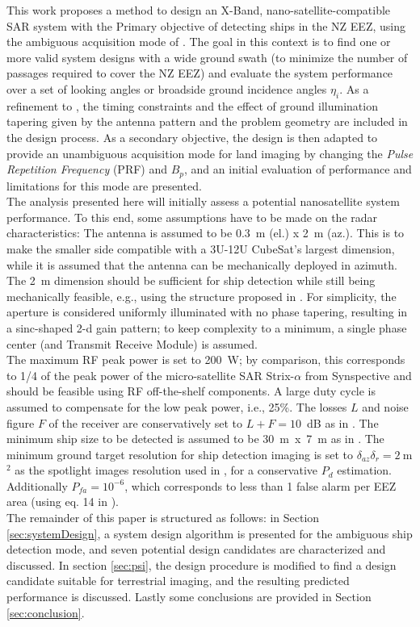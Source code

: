 \documentclass[conference,a4paper]{IEEEtran}
\begin{document}
    This work proposes a method to design an X-Band, nano-satellite-compatible SAR system with the Primary objective of detecting ships in the NZ EEZ, using the ambiguous acquisition mode of \cite{DLRjournal}.
    The goal in this context is to find one or more valid system designs with a wide ground swath (to minimize the number of passages required to cover the NZ EEZ) and evaluate the system performance over a set of looking angles or broadside ground incidence angles $\eta_i$.
    As a refinement to \cite{DLRjournal}, the timing constraints and the effect of ground illumination tapering given by the antenna pattern and the problem geometry are included in the design process.
    As a secondary objective, the design is then adapted to provide an unambiguous acquisition mode for land imaging by changing the \emph{Pulse Repetition Frequency} (PRF) and $B_p$, and an initial evaluation of performance and limitations for this mode are presented.\\
    The analysis presented here will initially assess a potential nanosatellite system performance.
    To this end, some assumptions have to be made on the radar characteristics: The antenna is assumed to be 0.3~m (el.) x 2~m (az.).
    This is to make the smaller side compatible with a 3U-12U CubeSat's largest dimension, while it is assumed that the antenna can be mechanically deployed in azimuth.
    The 2~m dimension should be sufficient for ship detection \cite{DLRjournal} while still being mechanically feasible, e.g., using the structure proposed in \cite{Annalisa}.
    For simplicity, the aperture is considered uniformly illuminated with no phase tapering, resulting in a sinc-shaped 2-d gain pattern;
    to keep complexity to a minimum, a single phase center (and Transmit Receive Module) is assumed.\\
    The maximum RF peak power is set to 200~W; by comparison, this corresponds to 1/4 of the peak power of the micro-satellite SAR Strix-$\alpha$ from Synspective \cite{StriX-a} and should be feasible using RF off-the-shelf components.
    A large duty cycle is assumed to compensate for the low peak power, i.e., 25\%. The losses $L$ and noise figure $F$ of the receiver are conservatively set to $L+F = 10$~dB as in \cite{JAN}.
    The minimum ship size to be detected is assumed to be 30~m~x~7~m as in \cite{JAN}.
    The minimum ground target resolution for ship detection imaging is set to $\delta_{az}\delta_{r}=2~$m$^2$ as the spotlight images resolution used in \cite{DLRjournal}, for a conservative $P_d$ estimation.
    Additionally $P_{fa} = 10^{-6}$, which corresponds to less than 1 false alarm per EEZ area (using eq. 14 in \cite{DLRjournal}).\\
    The remainder of this paper is structured as follows: in Section \ref{sec:systemDesign}, a system design algorithm is presented for the ambiguous ship detection mode, and seven potential design candidates are characterized and discussed.
    In section \ref{sec:psi}, the design procedure is modified to find a design candidate suitable for terrestrial imaging, and the resulting predicted performance is discussed.
    Lastly some conclusions are provided in Section \ref{sec:conclusion}.
\end{document}

